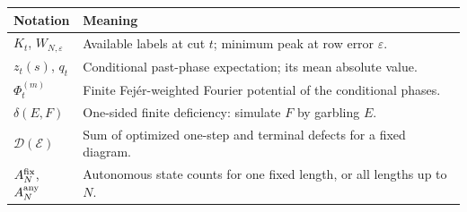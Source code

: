 \begin{center}\small
\begin{tabular}{p{}p{}}
\toprule
Notation & Meaning \\
\midrule
$K_t$, $W_{N,\varepsilon}$ & Available labels at cut $t$; minimum peak at row error $\varepsilon$.\\
$z_t(s)$, $q_t$ & Conditional past-phase expectation; its mean absolute value.\\
$\Phi_t^{(m)}$ & Finite Fej\'er-weighted Fourier potential of the conditional phases.\\
$\delta(E,F)$ & One-sided finite deficiency: simulate $F$ by garbling $E$.\\
$\mathcal D(\mathcal E)$ & Sum of optimized one-step and terminal defects for a fixed diagram.\\
$A_N^{\rm fix}$, $A_N^{\rm any}$ & Autonomous state counts for one fixed length, or all lengths up to $N$.\\
\bottomrule
\end{tabular}
\end{center}
